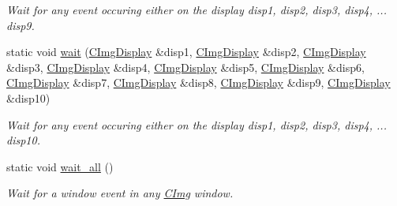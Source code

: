 \begin{DoxyCompactItemize}
\begin{DoxyCompactList}\small\item\em Wait for any event occuring either on the display {\ttfamily disp1}, {\ttfamily disp2}, {\ttfamily disp3}, {\ttfamily disp4}, ... {\ttfamily disp9}. \item\end{DoxyCompactList}\item 
\hypertarget{structcimg__library_1_1CImgDisplay_aa2fb3e192c2ba6a39a7965357c36a4ad}{
static void \hyperlink{structcimg__library_1_1CImgDisplay_aa2fb3e192c2ba6a39a7965357c36a4ad}{wait} (\hyperlink{structcimg__library_1_1CImgDisplay}{CImgDisplay} \&disp1, \hyperlink{structcimg__library_1_1CImgDisplay}{CImgDisplay} \&disp2, \hyperlink{structcimg__library_1_1CImgDisplay}{CImgDisplay} \&disp3, \hyperlink{structcimg__library_1_1CImgDisplay}{CImgDisplay} \&disp4, \hyperlink{structcimg__library_1_1CImgDisplay}{CImgDisplay} \&disp5, \hyperlink{structcimg__library_1_1CImgDisplay}{CImgDisplay} \&disp6, \hyperlink{structcimg__library_1_1CImgDisplay}{CImgDisplay} \&disp7, \hyperlink{structcimg__library_1_1CImgDisplay}{CImgDisplay} \&disp8, \hyperlink{structcimg__library_1_1CImgDisplay}{CImgDisplay} \&disp9, \hyperlink{structcimg__library_1_1CImgDisplay}{CImgDisplay} \&disp10)}
\label{structcimg__library_1_1CImgDisplay_aa2fb3e192c2ba6a39a7965357c36a4ad}

\begin{DoxyCompactList}\small\item\em Wait for any event occuring either on the display {\ttfamily disp1}, {\ttfamily disp2}, {\ttfamily disp3}, {\ttfamily disp4}, ... {\ttfamily disp10}. \item\end{DoxyCompactList}\item 
\hypertarget{structcimg__library_1_1CImgDisplay_a530c68e321d3adcb30fcefa06a25ca5b}{
static void \hyperlink{structcimg__library_1_1CImgDisplay_a530c68e321d3adcb30fcefa06a25ca5b}{wait\_\-all} ()}
\label{structcimg__library_1_1CImgDisplay_a530c68e321d3adcb30fcefa06a25ca5b}

\begin{DoxyCompactList}\small\item\em Wait for a window event in any \hyperlink{structcimg__library_1_1CImg}{CImg} window. \item\end{DoxyCompactList}\end{DoxyCompactItemize}



